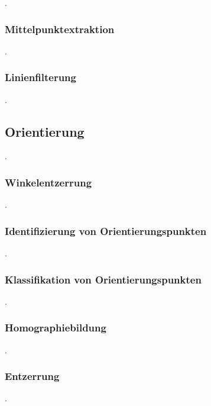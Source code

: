 .

\subsubsection{Mittelpunktextraktion}
\label{sec:mittelpunktextraktion}

.

\subsubsection{Linienfilterung}
\label{sec:linienfilterung}

.

\subsection{Orientierung}
\label{sec:orientierung}

.

\subsubsection{Winkelentzerrung}
\label{sec:winkelentzerrung}

.

\subsubsection{Identifizierung von Orientierungspunkten}
\label{sec:orientierungspunkte_finden}

.

\subsubsection{Klassifikation von Orientierungspunkten}
\label{sec:orientierungspunkte_klassifizieren}

.

\subsubsection{Homographiebildung}
\label{sec:homographie}

.

\subsubsection{Entzerrung}
\label{sec:entzerrung}

.
